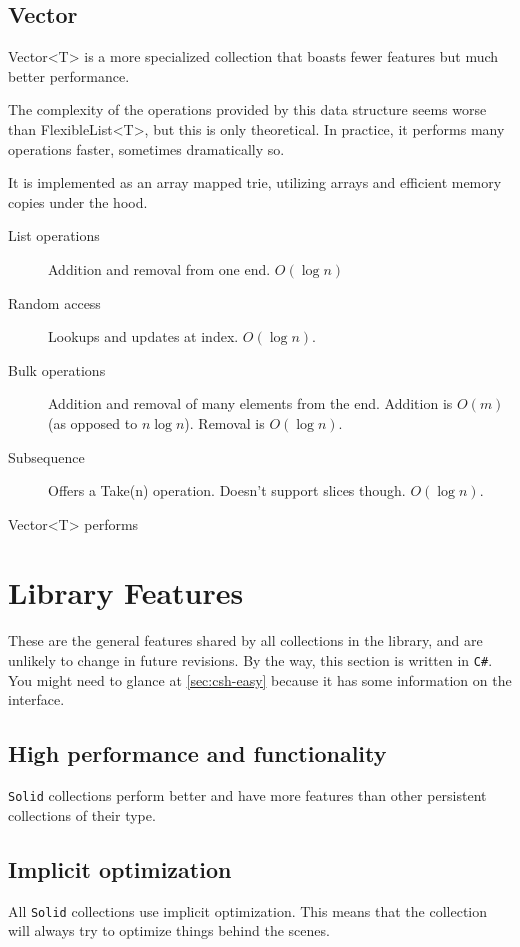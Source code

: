 \documentclass[]{article}
\newcommand{\codeformat}{\ttfamily}
\newcommand{\methodformat}{\codeformat\color{MidnightBlue}}
\newcommand{\classformat}{\codeformat\color{olive}}
\newcommand{\class}[1]{{\classformat #1}}
\newcommand{\method}[1]{{\methodformat #1}}
\newcommand{\solid}{\texttt{Solid}\xspace}
\newcommand{\csh}{\texttt{C\#}\xspace}
\begin{document}
\subsection{Ve\relax ctor}\label{sec:vector}
Vector<T> is a more specialized collection that boasts fewer features but much better performance. 

The complexity of the operations provided by this data structure seems worse than FlexibleList<T>, but this is only theoretical. In practice, it performs many operations faster, sometimes dramatically so.

It is implemented as an array mapped trie, utilizing arrays and efficient memory copies under the hood. 
\begin{description}
	\item[List operations] Addition and removal from one end. $O(\log n)$
	\item[Random access] Lookups and updates at index. $O(\log n)$.
	\item[Bulk operations] Addition and removal of many elements from the end. Addition is $O(m)$ (as opposed to $n \log n$). Removal is $O(\log n)$.
	\item[Subsequence] Offers a \method{Take(n)} operation. Doesn't support slices though. $O(\log n)$.
\end{description}

\class{Vector<T>} performs


\section{Library Features}\label{sec:library}
These are the general features shared by all collections in the library, and are unlikely to change in future revisions. By the way, this section is written in \csh. You might need to glance at \cref{sec:csh-easy} because it has some information on the interface.

\subsection{High performance and functionality}
\solid collections perform better and have more features than other persistent collections of their type. 

\subsection{Implicit optimization}\label{sec:optimization}
All \solid collections use implicit optimization. This means that the collection will always try to optimize things behind the scenes.
\end{document}
